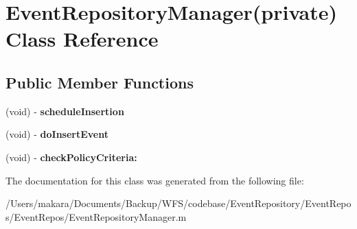 \hypertarget{interface_event_repository_manager_07private_08}{
\section{\-Event\-Repository\-Manager(private) \-Class \-Reference}
\label{interface_event_repository_manager_07private_08}
}
\subsection*{\-Public \-Member \-Functions}
\begin{DoxyCompactItemize}
\item 
\hypertarget{interface_event_repository_manager_07private_08_a7ae319dd5601077ace5a5994109fafb5}{
(void) -\/ {\bfseries schedule\-Insertion}}
\label{interface_event_repository_manager_07private_08_a7ae319dd5601077ace5a5994109fafb5}

\item 
\hypertarget{interface_event_repository_manager_07private_08_a9b0b4851e41c3bb5ee249f8ef06195af}{
(void) -\/ {\bfseries do\-Insert\-Event}}
\label{interface_event_repository_manager_07private_08_a9b0b4851e41c3bb5ee249f8ef06195af}

\item 
\hypertarget{interface_event_repository_manager_07private_08_aea68dace8bb435362cf499ec743e1285}{
(void) -\/ {\bfseries check\-Policy\-Criteria\-:}}
\label{interface_event_repository_manager_07private_08_aea68dace8bb435362cf499ec743e1285}

\end{DoxyCompactItemize}


\-The documentation for this class was generated from the following file\-:\begin{DoxyCompactItemize}
\item 
/\-Users/makara/\-Documents/\-Backup/\-W\-F\-S/codebase/\-Event\-Repository/\-Event\-Repos/\-Event\-Repos/\-Event\-Repository\-Manager.\-m\end{DoxyCompactItemize}
